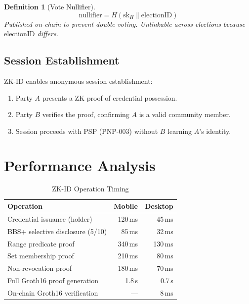 \documentclass[11pt,a4paper]{article}
\newtheorem{definition}{Definition}[section]
\begin{document}
\begin{definition}[Vote Nullifier]
    \[
        \mathrm{nullifier} = H(\mathrm{sk}_H \| \mathrm{electionID})
    \]
    Published on-chain to prevent double voting.  Unlinkable across
    elections because $\mathrm{electionID}$ differs.
\end{definition}

\subsection{Session Establishment}

ZK-ID enables anonymous session establishment:

\begin{enumerate}
    \item Party $A$ presents a ZK proof of credential possession.
    \item Party $B$ verifies the proof, confirming $A$ is a valid
    community member.
    \item Session proceeds with PSP (PNP-003) without $B$ learning
    $A$'s identity.
\end{enumerate}

\section{Performance Analysis}
\label{sec:performance}

\begin{table}[h]
\centering
\caption{ZK-ID Operation Timing}
\label{tab:perf}
\begin{tabular}{@{}lrr@{}}
\toprule
\textbf{Operation} & \textbf{Mobile} & \textbf{Desktop} \\
\midrule
Credential issuance (holder)     & 120\,ms  & 45\,ms \\
BBS+ selective disclosure (5/10) & 85\,ms   & 32\,ms \\
Range predicate proof            & 340\,ms  & 130\,ms \\
Set membership proof             & 210\,ms  & 80\,ms \\
Non-revocation proof             & 180\,ms  & 70\,ms \\
Full Groth16 proof generation    & 1.8\,s   & 0.7\,s \\
On-chain Groth16 verification    & ---      & 8\,ms \\
\bottomrule
\end{tabular}
\end{table}
\end{document}
